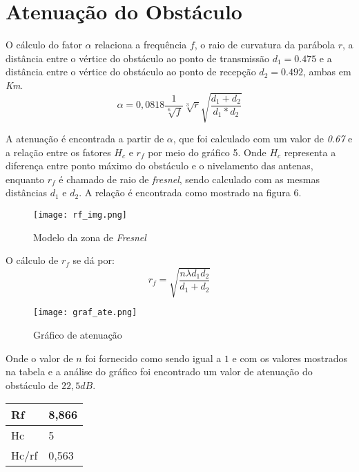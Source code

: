 \section{Atenuação do Obstáculo}
O cálculo do fator $\alpha$ relaciona a frequência $f$, o raio de curvatura da parábola $r$, a distância entre o vértice do obstáculo ao ponto de transmissão $d_1 = 0.475$ e a distância entre o vértice do obstáculo ao ponto de recepção $d_2 = 0.492 $, ambas em \textit{Km}.
\begin{equation}
\alpha = 0,0818\dfrac{1}{\sqrt[6]{f}}\sqrt[3]{r}\sqrt{\dfrac{d_1+d_2}{d_1*d_2}}
\end{equation}

A atenuação é encontrada a partir de $\alpha$, que foi calculado com um valor de \textit{0.67} e a relação entre os fatores  $H_c$ e $r_f$ por meio do gráfico 5. Onde $H_c$ representa a diferença entre ponto máximo do obstáculo e o nivelamento das antenas, enquanto $r_f$  é chamado de raio de \textit{fresnel}, sendo calculado com as mesmas distâncias $d_1$ e $d_2$. A relação é encontrada como mostrado na figura 6.

\begin{figure}[h]
	\centering
	\texttt{[image: rf\_img.png]}
	\label{fig:rf_img}
	\caption{Modelo da zona de \textit{Fresnel}}
\end{figure}

O cálculo de $r_f$ se dá por:
\begin{equation}
r_f = \sqrt{\dfrac{n\lambda d_1 d_2}{d_1 + d_2}}
\end{equation}

\begin{figure}[h]
	\centering
	\texttt{[image: graf\_ate.png]}
	\label{fig:graf_ate}
	\caption{Gráfico de atenuação}
\end{figure} 

Onde o valor de $n$ foi fornecido como sendo igual a $1$ e com os valores mostrados na tabela e a análise do gráfico foi encontrado um valor de atenuação do obstáculo de $22,5dB$.

\begin{center}
	\begin{table}[]
		\begin{tabular}{|l|l|}
			\hline
			Rf    & 8,866 \\ \hline
			Hc    & 5     \\ \hline
			Hc/rf & 0,563 \\ \hline
		\end{tabular}
	\end{table}
\end{center}


